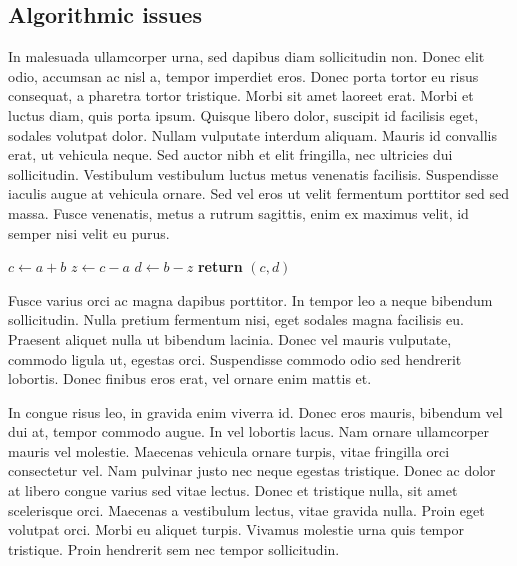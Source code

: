 \documentclass{article}
\begin{document}
	

\subsection{Algorithmic issues}

In malesuada ullamcorper urna, sed dapibus diam sollicitudin non. Donec elit odio, accumsan ac nisl a, tempor imperdiet eros. Donec porta tortor eu risus consequat, a pharetra tortor tristique. Morbi sit amet laoreet erat. Morbi et luctus diam, quis porta ipsum. Quisque libero dolor, suscipit id facilisis eget, sodales volutpat dolor. Nullam vulputate interdum aliquam. Mauris id convallis erat, ut vehicula neque. Sed auctor nibh et elit fringilla, nec ultricies dui sollicitudin. Vestibulum vestibulum luctus metus venenatis facilisis. Suspendisse iaculis augue at vehicula ornare. Sed vel eros ut velit fermentum porttitor sed sed massa. Fusce venenatis, metus a rutrum sagittis, enim ex maximus velit, id semper nisi velit eu purus.

\begin{center}
	\begin{minipage}{0.5\linewidth} %
		\begin{algorithm}[H]
			\medskip
			$c \leftarrow a + b$ \;
			$z \leftarrow c - a$ \;
			$d \leftarrow b - z$ \;
			{\bf return} $(c,d)$ \;
			\caption{\texttt{FastTwoSum}} %
			\label{alg:fastTwoSum}   %
		\end{algorithm}
	\end{minipage}
\end{center}

Fusce varius orci ac magna dapibus porttitor. In tempor leo a neque bibendum sollicitudin. Nulla pretium fermentum nisi, eget sodales magna facilisis eu. Praesent aliquet nulla ut bibendum lacinia. Donec vel mauris vulputate, commodo ligula ut, egestas orci. Suspendisse commodo odio sed hendrerit lobortis. Donec finibus eros erat, vel ornare enim mattis et.

\begin{question}
	In congue risus leo, in gravida enim viverra id. Donec eros mauris, bibendum vel dui at, tempor commodo augue. In vel lobortis lacus. Nam ornare ullamcorper mauris vel molestie. Maecenas vehicula ornare turpis, vitae fringilla orci consectetur vel. Nam pulvinar justo nec neque egestas tristique. Donec ac dolor at libero congue varius sed vitae lectus. Donec et tristique nulla, sit amet scelerisque orci. Maecenas a vestibulum lectus, vitae gravida nulla. Proin eget volutpat orci. Morbi eu aliquet turpis. Vivamus molestie urna quis tempor tristique. Proin hendrerit sem nec tempor sollicitudin.
\end{question}
\end{document}
